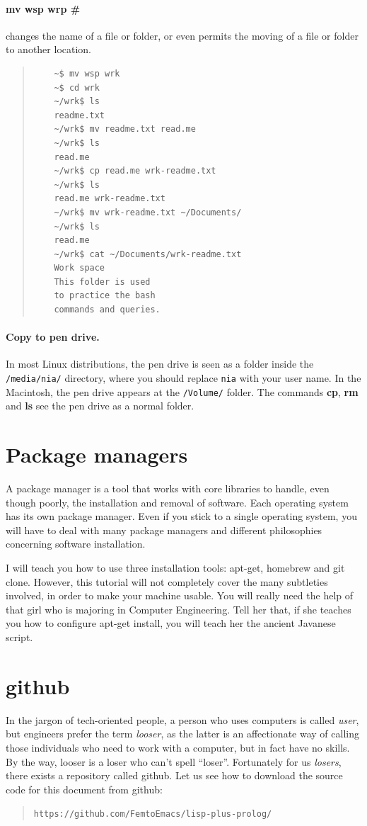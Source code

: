 \documentclass[a4paper,12pt]{book}
\begin{document}
\paragraph{mv wsp wrp \#} changes
the name of a file or folder, or
even permits the moving of a file or
folder to another location.
\begin{quote}
	\begin{verbatim}
	~$ mv wsp wrk
	~$ cd wrk
	~/wrk$ ls
	readme.txt
	~/wrk$ mv readme.txt read.me
	~/wrk$ ls
	read.me
	~/wrk$ cp read.me wrk-readme.txt
	~/wrk$ ls
	read.me wrk-readme.txt
	~/wrk$ mv wrk-readme.txt ~/Documents/
	~/wrk$ ls
	read.me
	~/wrk$ cat ~/Documents/wrk-readme.txt
	Work space
	This folder is used
	to practice the bash
	commands and queries.
	\end{verbatim}
\end{quote}

\paragraph{Copy to pen drive.}
In most Linux distributions, the pen drive is
seen as a folder inside the \verb|/media/nia/|
directory, where you should replace \verb|nia|
with your user name. In the Macintosh, the
pen drive appears at the \verb|/Volume/| folder.
The commands {\bf cp}, {\bf rm} and {\bf ls}
see the pen drive as a normal folder.


\section{Package managers}
A package
manager is a tool that works with
core libraries to handle, even though poorly,
the installation and removal of
software. Each operating system has its own
package manager. Even if you stick to a single
operating system, you will have to
deal with many package managers
and different philosophies concerning
software installation.


I will teach you how to use three
installation tools: apt-get,
homebrew and git clone. However,
this tutorial will not
completely cover the many subtleties
involved, in order to make your machine usable.
You will really need the help of
that girl who is majoring in
Computer Engineering.
Tell her that, if she teaches you
how to configure apt-get install,
you will teach her the ancient
Javanese script.


\section{github}
In the jargon of tech-oriented people,
a person who uses computers is called
{\em user}, but engineers
prefer the term {\em looser}, as
the latter is an affectionate way
of calling those individuals who need to work
with a computer, but in fact have no skills. By the way,
looser is a loser who can't spell ``loser''.
Fortunately for us {\em losers}, there exists
a repository called github. Let us see how
to download the source code for this document
from github:
\begin{quote}
	\verb|https://github.com/FemtoEmacs/lisp-plus-prolog/|
\end{quote}
\end{document}
